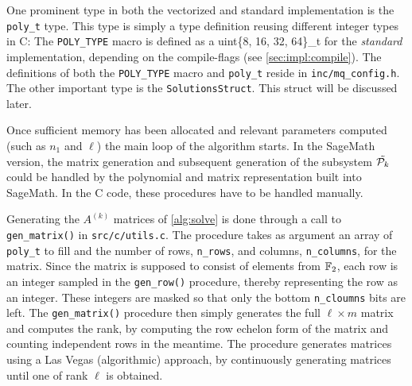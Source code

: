 One prominent type in both the vectorized and standard implementation is the \texttt{poly\_t} type. This type is simply a type definition reusing different integer types in C:
The \texttt{POLY\_TYPE} macro is defined as a uint\{8, 16, 32, 64\}\_t for the \textit{standard} implementation, depending on the compile-flags (see \cref{sec:impl:compile}). The definitions of both the \texttt{POLY\_TYPE} macro and \texttt{poly\_t} reside in \texttt{inc/mq\_config.h}. The other important type is the \texttt{SolutionsStruct}. This struct will be discussed later.

Once sufficient memory has been allocated and relevant parameters computed (such as $n_1$ and $\ell$) the main loop of the algorithm starts. In the SageMath version, the matrix generation and subsequent generation of the subsystem $\Tilde{\mathcal{P}_k}$ could be handled by the polynomial and matrix representation built into SageMath. In the C code, these procedures have to be handled manually. 

Generating the $A^{(k)}$ matrices of \cref{alg:solve} is done through a call to \texttt{gen\_matrix()} in \texttt{src/c/utils.c}. The procedure takes as argument an array of \texttt{poly\_t} to fill and the number of rows, \texttt{n\_rows}, and columns, \texttt{n\_columns}, for the matrix. Since the matrix is supposed to consist of elements from $\mathbb{F}_2$, each row is an integer sampled in the \texttt{gen\_row()} procedure, thereby representing the row as an integer. These integers are masked so that only the bottom \texttt{n\_cloumns} bits are left. The \texttt{gen\_matrix()} procedure then simply generates the full $\ell \times m$ matrix and computes the rank, by computing the row echelon form of the matrix and counting independent rows in the meantime. The procedure generates matrices using a Las Vegas (algorithmic) approach, by continuously generating matrices until one of rank $\ell$ is obtained.

